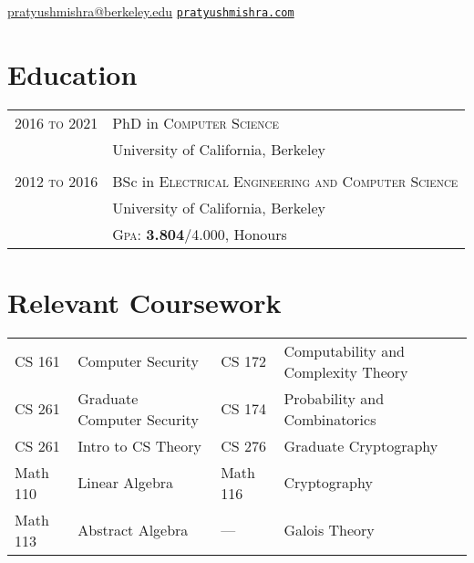 \documentclass[10pt]{article}
\begin{document}
\pagestyle{empty} %

{\par}

\href{mailto:pratyushmishra@berkeley.edu}{pratyushmishra@berkeley.edu}
\hfill
\href{http://www.pratyushmishra.com}{\texttt{pratyushmishra.com}}

\section{Education}
\begin{tabular}{R{2cm}p{11cm}}
  \textsc{2016 to 2021} & PhD in \textsc{Computer Science} \\
                        & University of California, Berkeley\\\\
  \textsc{2012 to 2016} & BSc in \textsc{Electrical Engineering and Computer Science} \\
                       & University of California, Berkeley\\
                       & \textsc{Gpa:} \textbf{3.804}/4.000, {Honours} \\
\end{tabular}
\section{Relevant Coursework}
\begin{tabular}{R{2cm}p{5cm}R{1.5cm}p{6cm}}
  CS 161   & Computer Security          & CS 172   & Computability and Complexity Theory\\
  CS 261   & Graduate Computer Security & CS 174   & Probability and Combinatorics\\
  CS 261   & Intro to CS Theory         & CS 276   & Graduate Cryptography\\
  Math 110 & Linear Algebra             & Math 116 & Cryptography\\
  Math 113 & Abstract Algebra           & ---      & Galois Theory\\
\end{tabular}



\end{document}
